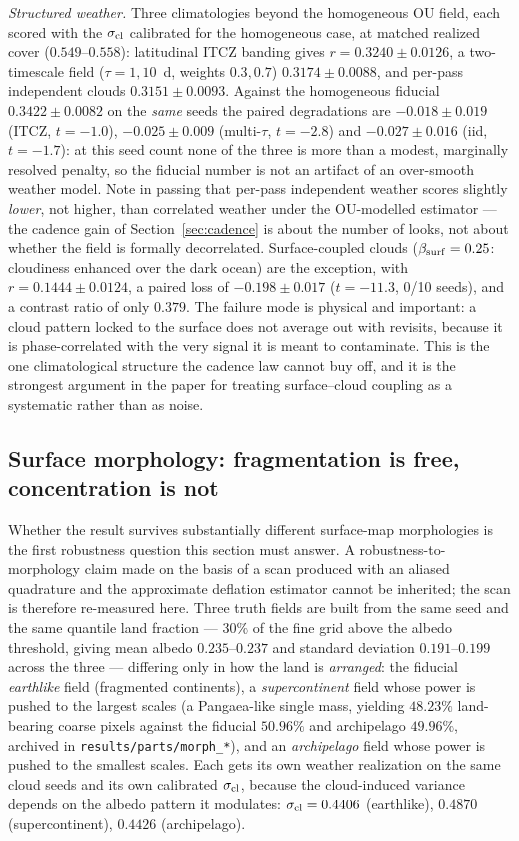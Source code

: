 \documentclass[twocolumn,10pt]{article}
\begin{document}
\emph{Structured weather.} Three climatologies beyond the homogeneous OU
field, each scored with the $\sigma_{\rm cl}$ calibrated for the homogeneous
case, at matched realized cover ($0.549$--$0.558$): latitudinal ITCZ banding
gives $r=0.3240\pm0.0126$, a two-timescale field ($\tau=1,10$~d, weights $0.3,0.7$)
$0.3174\pm0.0088$, and per-pass independent clouds $0.3151\pm0.0093$. Against
the homogeneous fiducial $0.3422\pm0.0082$ on the \emph{same} seeds the paired
degradations are $-0.018\pm0.019$ (ITCZ, $t=-1.0$), $-0.025\pm0.009$
(multi-$\tau$, $t=-2.8$) and $-0.027\pm0.016$ (iid, $t=-1.7$): at this seed
count none of the three is more than a modest, marginally resolved penalty, so
the fiducial number is not an artifact of an over-smooth weather model. Note in
passing that per-pass independent weather scores slightly \emph{lower}, not
higher, than correlated weather under the OU-modelled estimator --- the cadence
gain of Section~\ref{sec:cadence} is about the number of looks, not about
whether the field is formally decorrelated. Surface-coupled clouds
($\beta_{\rm surf}=0.25$: cloudiness enhanced over the dark ocean) are the
exception, with $r=0.1444\pm0.0124$, a paired loss of $-0.198\pm0.017$
($t=-11.3$, 0/10 seeds), and a contrast ratio of only $0.379$. The failure mode
is physical and important: a cloud pattern locked to the surface does not
average out with revisits, because it is phase-correlated with the very signal
it is meant to contaminate. This is the one climatological structure the cadence
law cannot buy off, and it is the strongest argument in the paper for treating
surface--cloud coupling as a systematic rather than as noise.

\subsection{Surface morphology: fragmentation is free, concentration is not}
\label{sec:morph}
Whether the result survives substantially different surface-map
morphologies is the first robustness question this section must answer. A robustness-to-morphology claim made on the
basis of a scan produced with an aliased quadrature and the approximate
deflation estimator cannot be inherited; the scan is therefore re-measured here. Three truth fields are built
from the same seed and the same quantile land fraction --- $30\%$ of the fine
grid above the albedo threshold, giving mean albedo $0.235$--$0.237$ and
standard deviation $0.191$--$0.199$ across the three --- differing only in how the
land is \emph{arranged}: the fiducial \emph{earthlike} field (fragmented
continents), a \emph{supercontinent} field whose power is pushed to the largest
scales (a Pangaea-like single mass, yielding $48.23\%$ land-bearing coarse pixels
against the fiducial $50.96\%$ and archipelago $49.96\%$, archived in {\tt results/parts/morph\_*}), and an \emph{archipelago} field whose power is pushed to
the smallest scales. Each gets its own weather realization on the same
cloud seeds and its own calibrated $\sigma_{\rm cl}$, because the cloud-induced
variance depends on the albedo pattern it modulates: $\sigma_{\rm cl}=0.4406$
(earthlike), $0.4870$ (supercontinent), $0.4426$ (archipelago).
\end{document}
